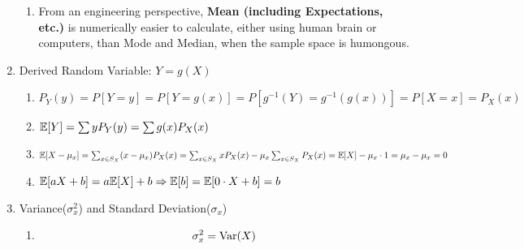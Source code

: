 \begin{enumerate}
{\begin{enumerate}
{\begin{enumerate}
{                        \begin{enumerate}
                            \item Bernoulli(p): \[\E{X}=0\cdot P_X(0)+1\cdot P_X(1)=0(1-p)+1(p)=p\]
                            \item Binomial(n, p): \[\E{X}=np\]
                            \item Poisson($\alpha$): \[\E{X}=\alpha\]
                            \item Geometric(p): \[\E{X}=\sum_{x=1}^{\infty}xP_X(x)=\sum_{x=1}^{\infty}xp(1-p)^{x-1}=\dfrac{p}{1-p}\sum_{x=1}^{\infty}x(1-p)^x=\dfrac{p}{1-p}\dfrac{1-p}{[1-(1-p)]^2}=\dfrac{p}{p^2}=\dfrac{1}{p}\]
                            \item Pascal(k, p): \[\E{X}=k/p\]
                            \item Discrete Uniform(k, l): \[\E{X}=(k+l)/2\]
                        \end{enumerate}
                    }
                \end{enumerate}
            }
            \item From an engineering perspective, \textbf{Mean (including Expectations, etc.)} is numerically easier to calculate, either using human brain or computers, than Mode and Median, when the sample space is humongous. 
        \end{enumerate}
    }
    \item Derived Random Variable: $Y = g(X)${
        \begin{enumerate}
            \item $P_Y(y) = P[Y=y] = P[Y=g(x)] = P[g^{-1}(Y)=g^{-1}(g(x))] = P[X=x] = P_X(x)$
            \item $\E{Y} = \sum yP_Y(y) = \sum g(x)P_X(x)$
            \item $\E{X-\mu_x}=\sum_{x\in S_X}(x-\mu_x)P_X(x)=\sum_{x\in S_X}xP_X(x)-\mu_x\sum_{x\in S_X}P_X(x)=\E{X}-\mu_x\cdot 1=\mu_x-\mu_x=0$
            \item $\E{aX+b}=a\E{X}+b \Rightarrow \E{b}=\E{0\cdot X+b}=b$
        \end{enumerate}
    }
    \item Variance($\sigma_x^2$) and Standard Deviation($\sigma_x$){
        \begin{enumerate}
            \item {
                \begin{align*}
                    \sigma_x^2 
                    &= \Var(X) \\

\end{align*}}
\end{enumerate}}
\end{enumerate}
